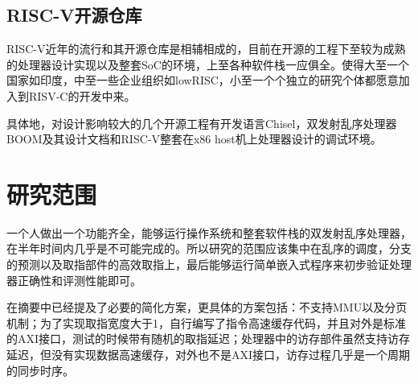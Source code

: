 	\subsection{RISC-V开源仓库}
	RISC-V近年的流行和其开源仓库是相辅相成的，目前在开源的工程下至较为成熟的处理器设计实现以及整套SoC的环境，上至各种软件栈一应俱全。使得大至一个国家如印度，中至一些企业组织如lowRISC，小至一个个独立的研究个体都愿意加入到RISV-C的开发中来。
	
	具体地，对设计影响较大的几个开源工程有开发语言Chisel，双发射乱序处理器BOOM及其设计文档和RISC-V整套在x86 host机上处理器设计的调试环境。
	
	\section{研究范围}
	
	一个人做出一个功能齐全，能够运行操作系统和整套软件栈的双发射乱序处理器，在半年时间内几乎是不可能完成的。所以研究的范围应该集中在乱序的调度，分支的预测以及取指部件的高效取指上，最后能够运行简单嵌入式程序来初步验证处理器正确性和评测性能即可。
	
	在摘要中已经提及了必要的简化方案，更具体的方案包括：不支持MMU以及分页机制；为了实现取指宽度大于1，自行编写了指令高速缓存代码，并且对外是标准的AXI接口，测试的时候带有随机的取指延迟；处理器中的访存部件虽然支持访存延迟，但没有实现数据高速缓存，对外也不是AXI接口，访存过程几乎是一个周期的同步时序。
	